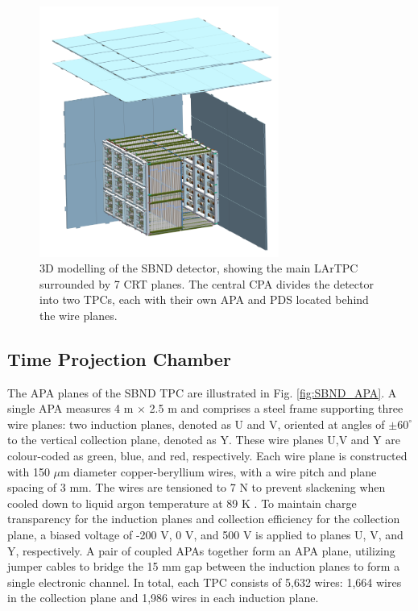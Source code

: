 \begin{figure}[htbp] 
\centering    
\includegraphics[width=0.70\textwidth]{SBND_Pretty}
\caption[SBND_Pretty]{
3D modelling of the SBND detector, showing the main LArTPC surrounded by 7 CRT planes.
The central CPA divides the detector into two TPCs, each with their own APA and PDS located behind the wire planes.
}
\label{fig:SBND_Pretty}
\end{figure}

\subsection{Time Projection Chamber}

The APA planes of the SBND TPC are illustrated in Fig. \ref{fig:SBND_APA}. 
A single APA measures 4 m $\times$ 2.5 m and comprises a steel frame supporting three wire planes: two induction planes, denoted as U and V, oriented at angles of $\pm 60^{\circ}$ to the vertical collection plane, denoted as Y. 
These wire planes U,V and Y are colour-coded as green, blue, and red, respectively.
Each wire plane is constructed with 150 $\mu$m diameter copper-beryllium wires, with a wire pitch and plane spacing of 3 mm. 
The wires are tensioned to 7 N to prevent slackening when cooled down to liquid argon temperature at 89 K \cite{SBND_Wires}.
To maintain charge transparency for the induction planes and collection efficiency for the collection plane, a biased voltage of -200 V, 0 V, and 500 V is applied to planes U, V, and Y, respectively.
A pair of coupled APAs together form an APA plane, utilizing jumper cables to bridge the 15 mm gap between the induction planes to form a single electronic channel. 
In total, each TPC consists of 5,632 wires: 1,664 wires in the collection plane and 1,986 wires in each induction plane.


